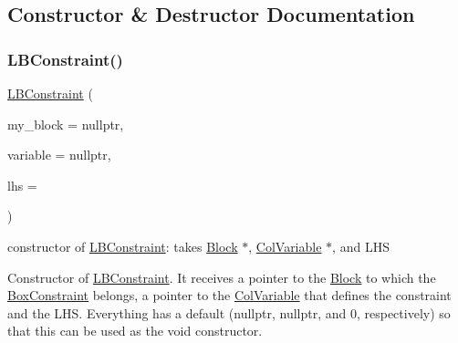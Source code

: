 \subsection{Constructor \& Destructor Documentation}
\mbox{\label{class_s_m_spp__di__unipi__it_1_1_l_b_constraint_afbe5719b3cca0e8aac8257a75a2d8ead}} 
\subsubsection{\texorpdfstring{L\+B\+Constraint()}{LBConstraint()}}
{\footnotesize\ttfamily \mbox{\hyperlink{class_s_m_spp__di__unipi__it_1_1_l_b_constraint}{L\+B\+Constraint}} (\begin{DoxyParamCaption}\item[{\mbox{\hyperlink{class_s_m_spp__di__unipi__it_1_1_block}{Block}} $\ast$}]{my\+\_\+block = {\ttfamily nullptr},  }\item[{\mbox{\hyperlink{class_s_m_spp__di__unipi__it_1_1_col_variable}{Col\+Variable}} $\ast$const}]{variable = {\ttfamily nullptr},  }\item[{\mbox{\hyperlink{class_s_m_spp__di__unipi__it_1_1_row_constraint_a34abd4b01d3a2024be5f6d13dd88779f}{c\+\_\+\+R\+H\+S\+Value}}}]{lhs = {} }\end{DoxyParamCaption})\hspace{0.3cm}{\ttfamily [inline]}}



constructor of \mbox{\hyperlink{class_s_m_spp__di__unipi__it_1_1_l_b_constraint}{L\+B\+Constraint}}\+: takes \mbox{\hyperlink{class_s_m_spp__di__unipi__it_1_1_block}{Block}} $\ast$, \mbox{\hyperlink{class_s_m_spp__di__unipi__it_1_1_col_variable}{Col\+Variable}} $\ast$, and L\+HS 

Constructor of \mbox{\hyperlink{class_s_m_spp__di__unipi__it_1_1_l_b_constraint}{L\+B\+Constraint}}. It receives a pointer to the \mbox{\hyperlink{class_s_m_spp__di__unipi__it_1_1_block}{Block}} to which the \mbox{\hyperlink{class_s_m_spp__di__unipi__it_1_1_box_constraint}{Box\+Constraint}} belongs, a pointer to the \mbox{\hyperlink{class_s_m_spp__di__unipi__it_1_1_col_variable}{Col\+Variable}} that defines the constraint and the L\+HS. Everything has a default (nullptr, nullptr, and 0, respectively) so that this can be used as the void constructor. 

